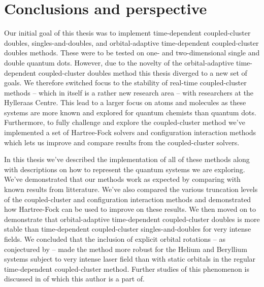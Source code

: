 \chapter{Conclusions and perspective}
    Our initial goal of this thesis was to implement time-dependent
    coupled-cluster doubles, singles-and-doubles, and orbital-adaptive
    time-dependent coupled-cluster doubles methods.
    These were to be tested on one- and two-dimensional single and double
    quantum dots.
    However, due to the novelty of the  orbital-adaptive time-dependent
    coupled-cluster doubles method this thesis diverged to a new set of goals.
    We therefore switched focus to the stability of real-time coupled-cluster
    methods -- which in itself is a rather new research area -- with researchers
    at the Hylleraas Centre.
    This lead to a larger focus on atoms and molecules as these systems are more
    known and explored for quantum chemists than quantum dots.
    Furthermore, to fully challenge and explore the coupled-cluster method we've
    implemented a set of Hartree-Fock solvers and configuration interaction
    methods which lets us improve and compare results from the coupled-cluster
    solvers.

    In this thesis we've described the implementation of all of these methods
    along with descriptions on how to represent the quantum systems we are
    exploring.
    We've demonstrated that our methods work as expected by comparing with known
    results from litterature.
    We've also compared the various truncation levels of the coupled-cluster
    and configuration interaction methods and demonstrated how Hartree-Fock can
    be used to improve on these results.
    We then moved on to demonstrate that orbital-adaptive time-dependent
    coupled-cluster doubles is more stable than time-dependent coupled-cluster
    singles-and-doubles for very intense fields.
    We concluded that the inclusion of explicit orbital rotations -- as
    conjectured by \citeauthor{pedersen2018symplectic}
    \cite{pedersen2018symplectic} -- made the method more robust for the Helium
    and Beryllium systems subject to very intense laser field than with static
    orbitals in the regular time-dependent coupled-cluster method.
    Further studies of this phenomenon is discussed in 
    \cite{oa-stability} of which this author is a part of.

